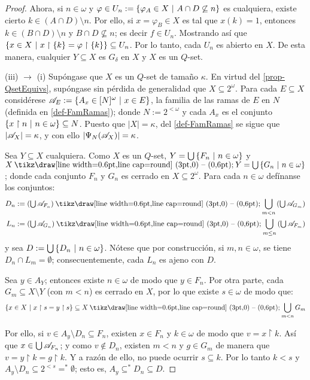 \begin{proof}
        Ahora, si $n \in \omega$ y $\varphi \in U_n:=\{\varphi_A \in X \text{ $|$ } A \cap D \not\subseteq n\}$ es cualquiera, existe cierto $k \in (A \cap D) \setminus n$. Por ello, si $x=\varphi_B \in X$ es tal que $x(k)=1$, entonces $k \in (B \cap D) \setminus n$ y $B \cap D \not \subseteq n$; es decir $f \in U_n$. Mostrando así que $\{ x \in X \text{ $|$ } x\upharpoonright \{k\} = \varphi \upharpoonright \{k\} \} \subseteq U_n$. Por lo tanto, cada $U_n$ es abierto en $X$. De esta manera, cualquier $Y \subseteq X$ es $G_\delta$ en $X$ y $X$ es un $Q$-set.

        (iii) $\to$ (i) Supóngase que $X$ es un $Q$-set de tamaño $\kappa$. En virtud del \autoref{prop-QsetEquivs}, supóngase sin pérdida de generalidad que $X \subseteq 2^\omega$. Para cada $E \subseteq X$ considérese $ \mathscr{A}_E:=\{ A_x \in [N]^\omega \text{ $|$ } x \in E \} $, la familia de las ramas de $E$ en $N$ (definida en \ref{def-FamRamas}); donde $N:=2^{<\omega}$ y cada $A_x$ es el conjunto $\{x \upharpoonright n \text{ $|$ } n \in \omega\} \subseteq N$. Puesto que $|X|=\kappa$, del \autoref{def-FamRamas} se sigue que $|\mathscr{A}_X|=\kappa$, y con ello $|\Psi_N(\mathscr{A}_X)|=\kappa$.

        Sea $Y \subseteq X$ cualquiera. Como $X$ es un $Q$-set, $Y=\mbox{$\bigcup$}\,\{F_n \text{ $|$ } n \in \omega\}$ y $X \setminus Y=\midcup\{G_n \tq n\in \omega\}$; donde cada conjunto $F_n$ y $G_n$ es cerrado en $X\subseteq 2^\omega$. Para cada $n \in \omega$ defínanse los conjuntos:
        \begin{align*}
            D_n := \left( \midcup \ms{A}_{F_n} \right) \setminus \bigcup_{m<n} \left( \midcup \ms{A}_{G_m} \right) \\
            L_n := \left( \midcup \ms{A}_{G_n} \right) \setminus \bigcup_{m\leq n} \left( \midcup \ms{A}_{F_m} \right)
        \end{align*}
        y sea $D:=\mbox{$\bigcup$}\,\{D_n \text{ $|$ } n \in \omega\}$. Nótese que por construcción, si $m,n \in \omega$, se tiene $D_n \cap L_m = \emptyset$; consecuentemente, cada $L_n$ es ajeno con $D$.

        Sea $y \in A_Y$; entonces existe $n \in \omega$ de modo que $y \in F_n$. Por otra parte, cada $G_m\subseteq X\setminus Y$ (con $m<n$) es cerrado en $X$, por lo que existe $s \in \omega$ de modo que:
        $$ \{ x \in X \tq x \upharpoonright s = y \upharpoonright s \} \subseteq X \setminus \bigcup_{m<n} G_m $$

        Por ello, si $v \in A_y \setminus D_n\subseteq F_n$, existen $x \in F_n$ y $k \in \omega$ de modo que $v = x \upharpoonright k$. Así que $x \in \mbox{$\bigcup$}\, \mathscr{A}_{F_n}$; y como $v \notin D_n$, existen $m<n$ y $g \in G_m$ de manera que $v = y \upharpoonright k = g \upharpoonright k$. Y a razón de ello, no puede ocurrir $s \subseteq k$. Por lo tanto $k<s$ y $A_y \setminus D_n \subseteq 2^{<s} =^* \emptyset$; esto es, $A_y \subseteq^* D_n \subseteq D$.


\end{proof}
